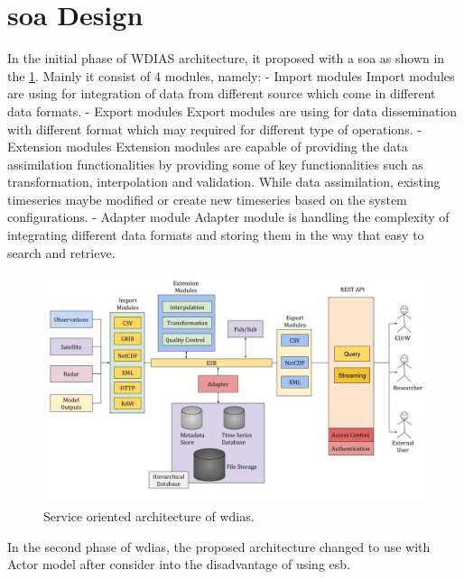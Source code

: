 \section{\acrfull{soa} Design}

In the initial phase of WDIAS architecture, it proposed with a \acrfull{soa} as shown in the \cref{fi:proposed_soa_arch_design}. Mainly it consist of 4 modules, namely:
- Import modules
Import modules are using for integration of data from different source which come in different data formats.
- Export modules
Export modules are using for data dissemination with different format which may required for different type of operations.
- Extension modules
Extension modules are capable of providing the data assimilation functionalities by providing some of key functionalities such as transformation, interpolation and validation. While data assimilation, existing timeseries maybe modified or create new timeseries based on the system configurations.
- Adapter module
Adapter module is handling the complexity of integrating different data formats and storing them in the way that easy to search and retrieve.

\begin{figure}[htp]
    \centering
    \includegraphics[width=1\textwidth]{method/soa/soa_v1.jpg}
    \caption{Service oriented architecture of \acrshort{wdias}.}
    \label{fi:proposed_soa_arch_design}
\end{figure}

In the second phase of \acrshort{wdias}, the proposed architecture changed to use with Actor model after consider into the disadvantage of using \acrshort{esb}.
